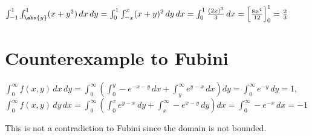 \documentclass{article}
\begin{document}
$\int_{-1}^{1} \int_{\abs{y}}^{1} (x + y^2) \, dx \, dy
= \int_{0}^{1} \int_{-x}^{x} (x + y)^2 \, dy \, dx
= \int_{0}^{1} \frac{(2x)^3}{3} \, dx 
= \left[\frac{8x^4}{12}\right]_0^1 
= \frac{2}{3}$

\section{Counterexample to Fubini}
$\int_{0}^{\infty} f(x, y) \, dx \, dy 
= \int_{0}^{\infty} \left(\int_{0}^{y} -e^{-x-y} \, dx + \int_{y}^{\infty} e^{y-x} \, dx \right) dy
= \int_{0}^{\infty} e^{-y} \, dy
= 1$, \\

$\int_{0}^{\infty} f(x, y) \, dy \, dx 
= \int_{0}^{\infty} \left(\int_{0}^{x} e^{y-x} \, dy + \int_{x}^{\infty} -e^{x-y} \, dy \right) dx
= \int_{0}^{\infty} -e^{-x} \, dx
= -1$

\vspace{10pt}

This is not a contradiction to Fubini since the domain is not bounded. 
\end{document}
